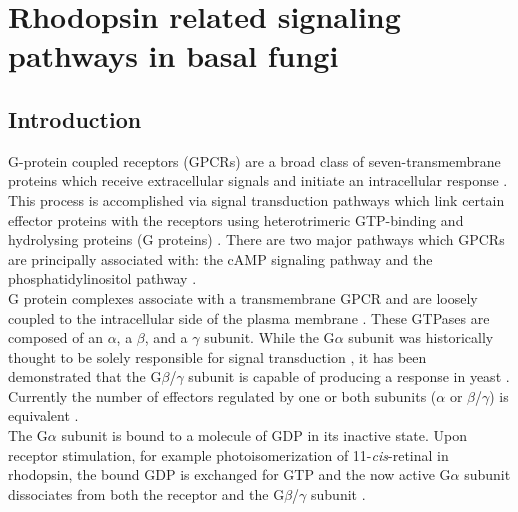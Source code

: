 \chapter{Rhodopsin related signaling pathways in basal fungi}
\label{chap:RhodAux}
\section{Introduction}
\indent G-protein coupled receptors (GPCRs) are a broad class of seven-transmembrane 
proteins which receive extracellular signals and initiate an intracellular response 
\cite{Lagerstrom2008}. This process is accomplished via signal transduction pathways 
which link certain effector proteins with the receptors using heterotrimeric GTP-binding 
and hydrolysing proteins (G proteins) \cite{Hepler1992}. There are two major pathways 
which GPCRs are principally associated with: the cAMP signaling pathway and the phosphatidylinositol pathway \cite{Gilman1987}.\\

\indent G protein complexes associate with a transmembrane GPCR and are loosely coupled to 
the intracellular side of the plasma membrane \cite{Clapham1997}.
These GTPases are composed of an $\alpha$, a $\beta$, and a $\gamma$ subunit. While the G$\alpha$ subunit 
was historically thought to be solely responsible for signal transduction \cite{Gilman}, 
it has been demonstrated that the G$\beta$/$\gamma$ subunit is capable of producing a 
response in yeast \cite{Whiteway}. Currently the number of effectors regulated by one 
or both subunits ($\alpha$ or $\beta$/$\gamma$) is equivalent \cite{Clapham1997}.\\ 

\indent The G$\alpha$ subunit is bound to a molecule of GDP in its inactive state. 
Upon receptor stimulation, for example photoisomerization of 11-\textit{cis}-retinal 
in rhodopsin, the bound GDP is exchanged for GTP and the now active G$\alpha$ subunit 
dissociates from both the receptor and the G$\beta$/$\gamma$ subunit \cite{Neves2002}.\\ 

